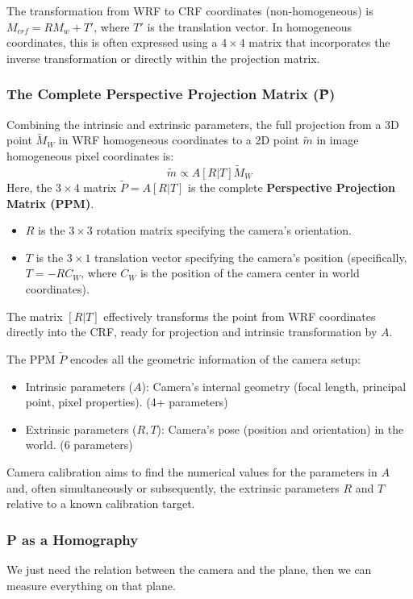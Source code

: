 \documentclass{article}
\begin{document}
The transformation from WRF to CRF coordinates (non-homogeneous) is $M_{crf} = R M_w + T'$, where $T'$ is the translation vector. In homogeneous coordinates, this is often expressed using a $4\times4$ matrix that incorporates the inverse transformation or directly within the projection matrix.

\subsubsection{The Complete Perspective Projection Matrix (\~{P})}

Combining the intrinsic and extrinsic parameters, the full projection from a 3D point $\tilde{M}_W$ in WRF homogeneous coordinates to a 2D point $\tilde{m}$ in image homogeneous pixel coordinates is:
\[
\tilde{m} \propto A [R | T] \tilde{M}_W
\]
Here, the $3 \times 4$ matrix $\tilde{P} = A[R|T]$ is the complete \textbf{Perspective Projection Matrix (PPM)}.
\begin{itemize}
    \item $R$ is the $3 \times 3$ rotation matrix specifying the camera's orientation.
    \item $T$ is the $3 \times 1$ translation vector specifying the camera's position (specifically, $T = -RC_W$, where $C_W$ is the position of the camera center in world coordinates).
\end{itemize}
The matrix $[R|T]$ effectively transforms the point from WRF coordinates directly into the CRF, ready for projection and intrinsic transformation by $A$.

The PPM $\tilde{P}$ encodes all the geometric information of the camera setup:
\begin{itemize}
    \item Intrinsic parameters ($A$): Camera's internal geometry (focal length, principal point, pixel properties). (4+ parameters)
    \item Extrinsic parameters ($R, T$): Camera's pose (position and orientation) in the world. (6 parameters)
\end{itemize}
Camera calibration aims to find the numerical values for the parameters in $A$ and, often simultaneously or subsequently, the extrinsic parameters $R$ and $T$ relative to a known calibration target.


\subsubsection{P as a Homography}
We just need the relation between the camera and the plane, then we can measure everything on that plane.
\end{document}
